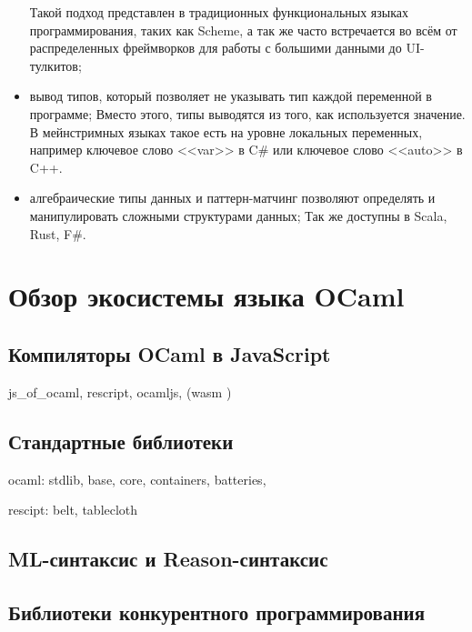 \begin{itemize}
            Такой подход представлен в традиционных функциональных языках программирования, таких как Scheme, а так же часто встречается
            во всём от распределенных фреймворков для работы с большими данными до UI-тулкитов;
      \item вывод типов, который позволяет не указывать тип каждой переменной в программе;
            Вместо этого, типы выводятся из того, как используется значение. В мейнстримных языках
            такое есть на уровне локальных переменных, например ключевое слово <<var>> в C\# или ключевое слово <<auto>> в C++.
      \item алгебраические типы данных и паттерн-матчинг позволяют определять и манипулировать сложными структурами данных;
            Так же доступны в Scala, Rust, F\#.

\end{itemize}

\section{Обзор экосистемы языка OCaml}

\TODO

\subsection{Компиляторы OCaml в JavaScript}\label{jsoo}

js\_of\_ocaml, rescript, ocamljs, (wasm \TODO) \TODO

\subsection{Стандартные библиотеки}

\TODO

ocaml: stdlib, base, core, containers, batteries,

rescipt: belt, tablecloth

\subsection{ML-синтаксис и Reason-синтаксис}

\TODO

\subsection{Библиотеки конкурентного программирования}

